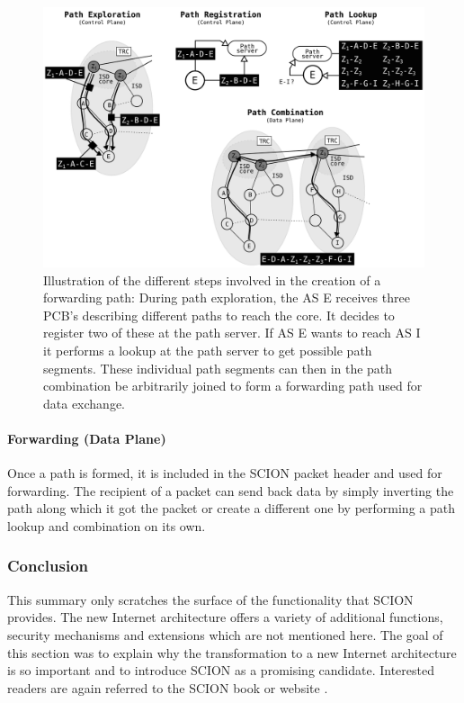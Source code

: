 \begin{figure}
	\begin{center}
		\def\svgwidth{1\textwidth}
		\includegraphics[scale=0.24]{../illustrations/importantConcepts/SCIONPathCreation.pdf} 
		\caption[Caption for the list of figures.]{Illustration of the different steps involved in the creation of a forwarding path: During path exploration, the AS E receives three PCB's describing different paths to reach the core. It decides to register two of these at the path server. If AS E wants to reach AS I it performs a lookup at the path server to get possible path segments. These individual path segments can then in the path combination be arbitrarily joined to form a forwarding path used for data exchange.}
		\label{fig:SCIONCreationForwardingPath}
	\end{center}
\end{figure}

\paragraph{Forwarding (Data Plane)}

Once a path is formed, it is included in the SCION packet header and used for forwarding. The recipient of a packet can send back data by simply inverting the path along which it got the packet or create a different one by performing a path lookup and combination on its own.

\subsubsection{Conclusion}

This summary only scratches the surface of the functionality that SCION provides. The new Internet architecture offers a variety of additional functions, security mechanisms and extensions which are not mentioned here. The goal of this section was to explain why the transformation to a new Internet architecture is so important and to introduce SCION as a promising candidate. Interested readers are again referred to the SCION book \cite{SCIONBook} or website \cite{SCIONWebMain}.
